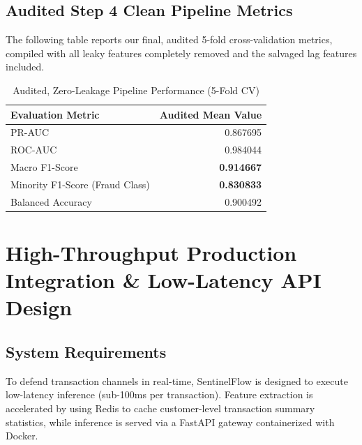 \documentclass[11pt,a4paper]{article}
\begin{document}
\subsection*{Audited Step 4 Clean Pipeline Metrics}
The following table reports our final, audited 5-fold cross-validation metrics, compiled with all leaky features completely removed and the salvaged lag features included.

\begin{table}[H]
\centering
\caption{Audited, Zero-Leakage Pipeline Performance (5-Fold CV)}\label{tab:step4_results}
\begin{tabular}{lr}
\toprule
\textbf{Evaluation Metric} & \textbf{Audited Mean Value} \\\midrule
PR-AUC & 0.867695 \\
ROC-AUC & 0.984044 \\
Macro F1-Score & \textbf{0.914667} \\
Minority F1-Score (Fraud Class) & \textbf{0.830833} \\
Balanced Accuracy & 0.900492 \\
\bottomrule
\end{tabular}
\end{table}

\section{High-Throughput Production Integration \& Low-Latency API Design}
\subsection*{System Requirements}
To defend transaction channels in real-time, SentinelFlow is designed to execute low-latency inference (sub-100ms per transaction). Feature extraction is accelerated by using Redis to cache customer-level transaction summary statistics, while inference is served via a FastAPI gateway containerized with Docker.
\end{document}
